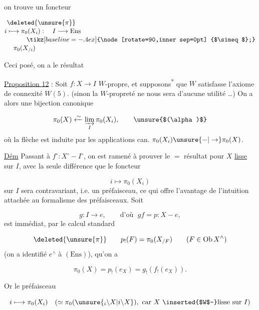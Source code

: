 on trouve un foncteur

\[
\begin{aligned}
&\deleted{\unsure{\pi}}\\[-2pt]
i&\longmapsto\pi_0(X_i):\quad I\longrightarrow\mathrm{Ens}\\[-2pt]
&\hspace{3em}\tikz[baseline=-.4ex]{\node[rotate=90,inner sep=0pt] {$\simeq$};}\\[-2pt]
&\hspace{1em}\pi_0(X_{/i})
\end{aligned}
\]

Ceci posé, on a le résultat 

\uline{Proposition 12} : Soit $f:X\longrightarrow I$ $W$-propre, et supposons\textsuperscript{*} que $W$ satisfasse l'axiome de connexité $W(5)$. (sinon la $W$-propreté ne nous sera d'aucune utilité \ldots) On a alors une bijection canonique

\[
\pi_0(X)\xleftarrow{\sim}\underset{I}{\varinjlim}\,\pi_0(X_i),\tag*{\unsure{$(\alpha)$}}
\]
où la flèche est induite par les applications can. $\pi_0(X_i)\unsure{-|\to}\pi_0(X)$.

\uline{Dém} Passant à $f^\circ:X^\circ-I^\circ$, on est ramené à prouver le $=$ résultat pour $X$ \uline{lisse} sur $I$, avec la seule différence que le foncteur

\[
i\longmapsto\pi_0(X_i)
\]
sur $I$ sera contravariant, i.e. un préfaisceau, ce qui offre l'avantage de l'intuition attachée au formalisme des préfaisceaux. Soit

\[
g:I\longrightarrow e,\qquad\text{d'où }\;gf=p:X-e,
\]
 est immédiat, par le calcul standard

\[
\deleted{\unsure{\pi}}\qquad p_!(F)=\pi_0(X_{/F})\qquad(F\in\mathrm{Ob}\,X^\wedge)
\]
 (on a identifié $e^\wedge$ à $(\mathrm{Ens})$), qu'on a

\[
\pi_0(X)=p_!(e_X)=g_!(f_!(e_X)).
\]

Or le préfaisceau

\[
i\longmapsto\pi_0(X_i)\quad(\simeq\pi_0(\unsure{{}_i\backslash X|i\backslash X}),\ \text{car }X\text{ \inserted{$W$-}lisse sur }I)
\]
